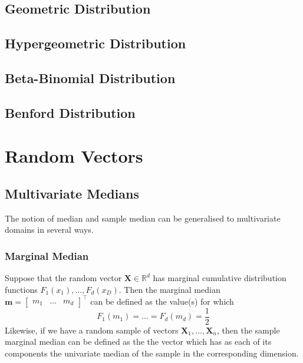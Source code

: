 \documentclass[11pt]{report} %
\begin{document}
\subsection{Geometric Distribution}

\subsection{Hypergeometric Distribution}

\subsection{Beta-Binomial Distribution}

\subsection{Benford Distribution}

\section{Random Vectors}

\subsection{Multivariate Medians}

The notion of median and sample median can be generalised to multivariate domains in several ways.

\subsubsection{Marginal Median}

Suppose that the random vector $\mathbf{X} \in \mathbb{R}^{d}$ has marginal cumulative distribution functions $F_{1}\left(x_{1}\right), \dots, F_{d}\left(x_{D}\right)$. Then the marginal median $\mathbf{m} = \begin{bmatrix} m_{1} & \dots & m_{d}\end{bmatrix}^{\top}$ can be defined as the value(s) for which
\begin{equation}
F_{1}\left(m_{1}\right) = \dots = F_{d}\left(m_{d}\right) = \dfrac{1}{2}
\end{equation}
Likewise, if we have a random sample of vectors $\mathbf{X}_{1}, \dots, \mathbf{X}_{n}$, then the sample marginal median can be defined as the the vector which has as each of its components the univariate median of the sample in the corresponding dimension.
\end{document}
